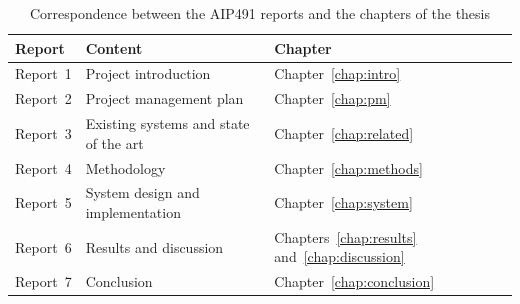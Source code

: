 \begin{table}[htbp]
\caption{Correspondence between the AIP491 reports and the chapters of the thesis}
\label{tab:intro-aip491}
\centering
\small
\begin{tabular}{p{}p{}p{}}
\toprule
\raggedright \textbf{Report} & \raggedright \textbf{Content} & \raggedright \textbf{Chapter} \tabularnewline
\midrule
\raggedright Report~1 & \raggedright Project introduction & \raggedright Chapter~\ref{chap:intro} \tabularnewline
\raggedright Report~2 & \raggedright Project management plan & \raggedright Chapter~\ref{chap:pm} \tabularnewline
\raggedright Report~3 & \raggedright Existing systems and state of the art & \raggedright Chapter~\ref{chap:related} \tabularnewline
\raggedright Report~4 & \raggedright Methodology & \raggedright Chapter~\ref{chap:methods} \tabularnewline
\raggedright Report~5 & \raggedright System design and implementation & \raggedright Chapter~\ref{chap:system} \tabularnewline
\raggedright Report~6 & \raggedright Results and discussion & \raggedright Chapters~\ref{chap:results} and~\ref{chap:discussion} \tabularnewline
\raggedright Report~7 & \raggedright Conclusion & \raggedright Chapter~\ref{chap:conclusion} \tabularnewline
\bottomrule
\end{tabular}
\end{table}
